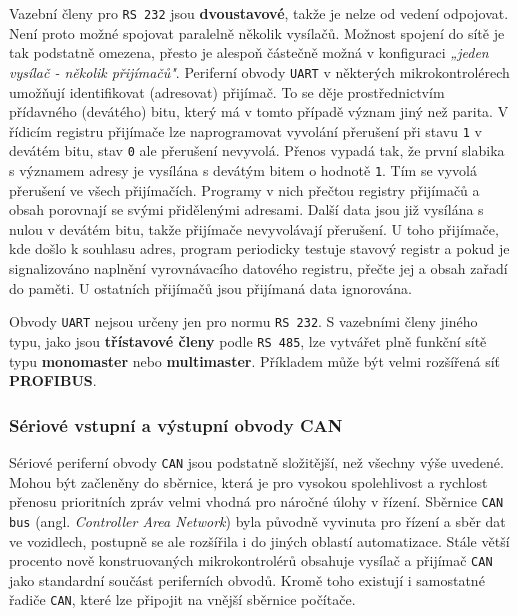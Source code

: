         Vazební členy pro \texttt{RS 232} jsou \textbf{dvoustavové}, takže je nelze od vedení
        odpojovat. Není proto možné spojovat paralelně několik vysílačů. Možnost spojení do sítě je
        tak podstatně omezena, přesto je alespoň částečně možná v konfiguraci \emph{„jeden vysílač -
        několik přijímačů"}. Periferní obvody \texttt{UART} v některých mikrokontrolérech umožňují
        identifikovat (adresovat) přijímač. To se děje prostřednictvím přídavného (devátého) bitu,
        který má v tomto případě význam jiný než parita. V řídicím registru přijímače lze
        naprogramovat vyvolání přerušení při stavu \texttt{1} v devátém bitu, stav \texttt{0} ale
        přerušení nevyvolá. Přenos vypadá tak, že první slabika s významem adresy je vysílána s
        devátým bitem o hodnotě \texttt{1}. Tím se vyvolá přerušení ve všech přijímačích. Programy
        v nich přečtou registry přijímačů a obsah porovnají se svými přidělenými adresami. Další
        data jsou již vysílána s nulou v devátém bitu, takže přijímače nevyvolávají přerušení. U
        toho přijímače, kde došlo k souhlasu adres, program periodicky testuje stavový registr a
        pokud je signalizováno naplnění vyrovnávacího datového registru, přečte jej a obsah zařadí
        do paměti. U ostatních přijímačů jsou přijímaná data ignorována.
        
        Obvody \texttt{UART} nejsou určeny jen pro normu \texttt{RS 232}. S vazebními členy jiného 
        typu, jako jsou \textbf{třístavové členy} podle \texttt{RS 485}, lze vytvářet plně funkční 
        sítě typu \textbf{monomaster} nebo \textbf{multimaster}. Příkladem může být velmi rozšířená 
        síť \textbf{PROFIBUS}.       
        
      \subsubsection{Sériové vstupní a výstupní obvody CAN}
        Sériové periferní obvody \texttt{CAN} jsou podstatně složitější, než všechny výše uvedené. 
        Mohou být začleněny do sběrnice, která je pro vysokou spolehlivost a rychlost přenosu 
        prioritních zpráv velmi vhodná pro náročné úlohy v řízení. Sběrnice \texttt{CAN bus} (angl. 
        \emph{Controller Area Network}) byla původně vyvinuta pro řízení a sběr dat ve vozidlech, 
        postupně se ale rozšířila i do jiných oblastí automatizace. Stále větší procento nově 
        konstruovaných mikrokontrolérů obsahuje vysílač a přijímač \texttt{CAN} jako standardní 
        součást periferních obvodů. Kromě toho existují i samostatné řadiče \texttt{CAN}, které lze 
        připojit na vnější sběrnice počítače.
        
